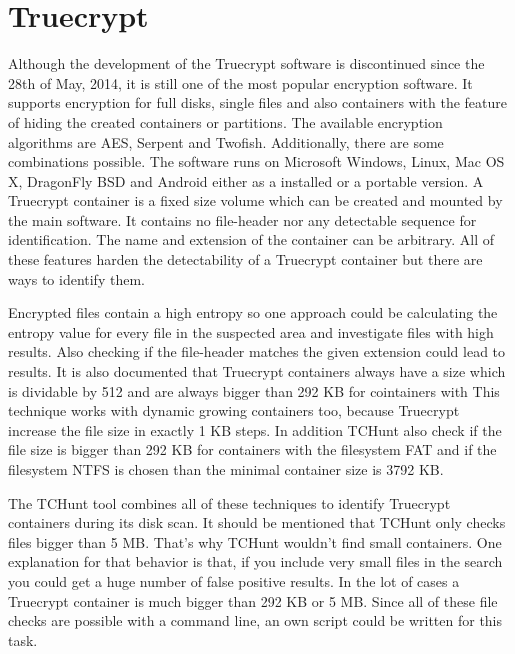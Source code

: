 \section{Truecrypt}
Although the development of the Truecrypt software is discontinued since the 28th of May, 2014, it is still one of the most popular encryption software.
It supports encryption for full disks, single files and also containers with the feature of hiding the created containers or partitions.
The available encryption algorithms are AES, Serpent and Twofish. Additionally, there are some combinations possible.
The software runs on Microsoft Windows, Linux, Mac OS X, DragonFly BSD and Android either as a installed or a portable version.\cite{wiki:truecrypt}
A Truecrypt container is a fixed size volume which can be created and mounted by the main software.
It contains no file-header nor any detectable sequence for identification.
The name and extension of the container can be arbitrary.
All of these features harden the detectability of a Truecrypt container but there are ways to identify them.

Encrypted files contain a high entropy so one approach could be calculating the entropy value for every file in the suspected area and investigate files with high results.
Also checking if the file-header matches the given extension could lead to results.
It is also documented that Truecrypt containers always have a size which is dividable by 512 and are always bigger than 292 KB for cointainers with
This technique works with dynamic growing containers too, because Truecrypt increase the file size in exactly 1 KB steps. In addition TCHunt also check if the file size is bigger than 292 KB for containers with the filesystem FAT and if the filesystem NTFS is chosen than the minimal container size is 3792 KB.
\cite{truecrypt:sourceCode}

The TCHunt tool combines all of these techniques to identify Truecrypt containers during its disk scan. It should be mentioned that TCHunt only checks files bigger than 5 MB.
That's why TCHunt wouldn't find small containers. One explanation for that behavior is that, if you include very small files in the search you could get a huge number of false positive results. In the lot of cases a Truecrypt container is much bigger than 292 KB or 5 MB. 
Since all of these file checks are possible with a command line, an own script could be written for this task.

